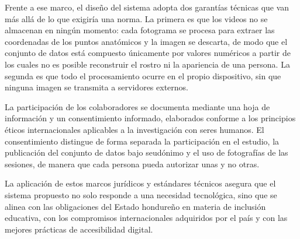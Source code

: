 Frente a ese marco, el diseño del sistema adopta dos garantías técnicas que van más allá
de lo que exigiría una norma. La primera es que los videos no se almacenan en ningún
momento: cada fotograma se procesa para extraer las coordenadas de los puntos anatómicos y
la imagen se descarta, de modo que el conjunto de datos está compuesto únicamente por
valores numéricos a partir de los cuales no es posible reconstruir el rostro ni la
apariencia de una persona. La segunda es que todo el procesamiento ocurre en el propio
dispositivo, sin que ninguna imagen se transmita a servidores externos.

La participación de los colaboradores se documenta mediante una hoja de información y un
consentimiento informado, elaborados conforme a los principios éticos internacionales
aplicables a la investigación con seres humanos. El consentimiento distingue de forma separada la participación en el estudio, la
publicación del conjunto de datos bajo seudónimo y el uso de fotografías de las sesiones,
de manera que cada persona pueda autorizar unas y no otras.

La aplicación de estos marcos jurídicos y estándares técnicos asegura que el sistema
propuesto no solo responde a una necesidad tecnológica, sino que se alinea con las
obligaciones del Estado hondureño en materia de inclusión educativa, con los compromisos
internacionales adquiridos por el país y con las mejores prácticas de accesibilidad
digital.

